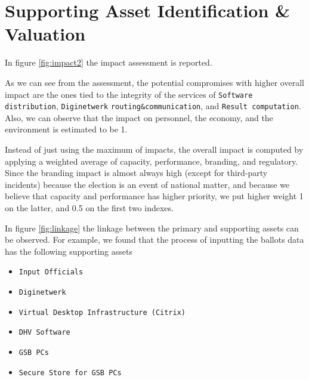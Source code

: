 \section*{Supporting Asset Identification \& Valuation}

In figure \ref{fig:impact2} the impact assessment is reported.

As we can see from the assessment, the potential compromises with higher overall impact are the ones tied to the integrity of the services of \texttt{Software distribution}, \texttt{Diginetwerk} \texttt{routing\&communication}, and \texttt{Result computation}. Also, we can observe that the impact on personnel, the economy, and the environment is estimated to be 1. 

Instead of just using the maximum of impacts, the overall impact is computed by applying a weighted average of capacity, performance, branding, and regulatory. Since the branding impact is almost always high (except for third-party incidents) because the election is an event of national matter, and because we believe that capacity and performance has higher priority, we put higher weight 1 on the latter, and 0.5 on the first two indexes.

In figure \ref{fig:linkage} the linkage between the primary and supporting assets can be observed. For example, we found that the process of inputting the ballots data has the following supporting assets

\begin{itemize}
    \item \texttt{Input Officials}
    \item \texttt{Diginetwerk}
    \item \texttt{Virtual Desktop Infrastructure (Citrix)}
    \item \texttt{DHV Software}
    \item \texttt{GSB PCs}
    \item \texttt{Secure Store for GSB PCs}
\end{itemize}


\newpage

